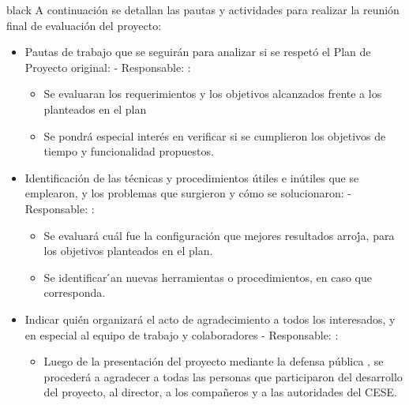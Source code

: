 \documentclass[
11pt, %
]{charter}
\begin{document}
\begin{consigna}{black}
A continuación se detallan las pautas y actividades para realizar la reunión final de evaluación del proyecto:

\begin{itemize}
	\item Pautas de trabajo que se seguirán para analizar si se respetó el Plan de Proyecto original:
	 - Responsable: \authorname:
	\begin{itemize}			
		\item Se evaluaran los requerimientos y los objetivos alcanzados frente a los planteados en el plan
		\item Se pondrá especial interés en verificar si se cumplieron los objetivos de tiempo y funcionalidad propuestos.
	\end{itemize}	    	 
	
	\item Identificación de las técnicas y procedimientos útiles e inútiles que se emplearon, y los problemas que surgieron y cómo se solucionaron:
	 - Responsable: \authorname:
	\begin{itemize}			
		\item Se evaluará cuál fue la configuración que mejores resultados arroj́a, para los objetivos planteados en el plan.
		\item Se identificar ́an nuevas herramientas o procedimientos, en caso que corresponda.
	\end{itemize}	    	 
	
	\item Indicar quién organizará el acto de agradecimiento a todos los interesados, y en especial al equipo de trabajo y colaboradores - Responsable: \authorname :
	\begin{itemize}			
		\item Luego de la presentación del proyecto mediante la defensa pública , se procederá a agradecer a todas las personas que participaron del desarrollo del proyecto, al director, a los compañeros y a las autoridades del CESE.
	\end{itemize}	 
	
	    	 
	 
\end{itemize}

\end{consigna}
\end{document}
